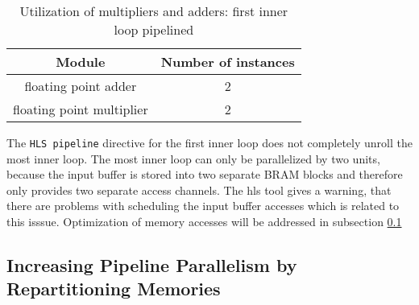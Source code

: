 \documentclass{article}
\begin{document}
\begin{enumerate}
	\begin{table}[H]
		\centering
		\begin{tabular}{cc}
			Module & Number of instances \\
			\hline
			floating point adder & 2 \\
			floating point multiplier & 2
		\end{tabular}
		\caption{Utilization of multipliers and adders: first inner loop pipelined}
		\label{1-b-resources-arithmetic-2}
	\end{table}

	The \texttt{HLS pipeline} directive for the first inner loop does not completely unroll the most inner loop. The most inner loop can only be parallelized by two units, because the input buffer is stored into two separate BRAM blocks and therefore only provides two separate access channels. The hls tool gives a warning, that there are problems with scheduling the input buffer accesses which is related to this isssue. Optimization of memory accesses will be addressed in subsection \ref{1-c}

\end{enumerate}


\subsection{Increasing Pipeline Parallelism by Repartitioning Memories}
\label{1-c}

	
\end{document}
